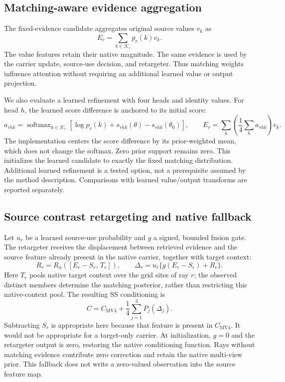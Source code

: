 \documentclass[10pt]{article}
\begin{document}
\subsection{Matching-aware evidence aggregation}
The fixed-evidence candidate aggregates original source values $v_k$ as
\begin{equation}
 E_r=\sum_{k\in\mathcal K_r}p_r(k)v_k.
\end{equation}
The value features retain their native magnitude. The same evidence is used
by the carrier update, source-use decision, and retargeter. Thus matching
weights influence attention without requiring an additional learned value or
output projection.

We also evaluate a learned refinement with four heads and identity values.
For head $h$, the learned score difference is anchored to its initial score:
\begin{equation}
 a_{rhk}=\operatorname{softmax}_{k\in\mathcal K_r}
 [\log p_r(k)+s_{rhk}(\theta)-s_{rhk}(\theta_0)],\qquad
 E_r=\sum_k\left(\frac14\sum_h a_{rhk}\right)v_k.
\end{equation}
The implementation centers the score difference by its prior-weighted mean,
which does not change the softmax. Zero prior support remains zero. This
initializes the learned candidate to exactly the fixed matching distribution.
Additional learned refinement is a tested option, not a prerequisite assumed
by the method description. Comparisons with learned value/output transforms
are reported separately.

\subsection{Source contrast retargeting and native fallback}
Let $u_r$ be a learned source-use probability and $g$ a signed, bounded fusion
gate. The retargeter receives the displacement between retrieved evidence and
the source feature already present in the native carrier, together with
target context:
\begin{equation}
 R_r=R_\phi([E_r-S_r,\,T_r]),\qquad
 \Delta_r=u_r\{g(E_r-S_r)+R_r\}.
\end{equation}
Here $T_r$ pools native target context over the grid sites of ray $r$;
the observed distinct members determine the matching posterior, rather than
restricting this native-context pool.
The resulting SS conditioning is
\begin{equation}
 C=C_{\mathrm{MV4}}+\frac14\sum_{j=1}^3P_j(\Delta_j).
\end{equation}
Subtracting $S_r$ is appropriate here because that feature is present in
$C_{\mathrm{MV4}}$. It would not be appropriate for a target-only carrier.
At initialization, $g=0$ and the retargeter output is zero, restoring the
native conditioning function. Rays without matching evidence contribute zero
correction and retain the native multi-view prior. This fallback does not
write a zero-valued observation into the source feature map.
\end{document}

